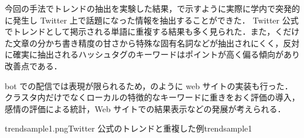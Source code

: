 
今回の手法でトレンドの抽出を実験した結果，で示すように実際に学内で突発的に発生し Twitter 上で話題になった情報を抽出することができた．
Twitter 公式でトレンドとして掲示される単語に重複する結果も多く見られた．また，くだけた文章の分かち書き精度の甘さから特殊な固有名詞などが抽出されにくく，反対に確実に抽出されるハッシュタグのキーワードはポイントが高く偏る傾向があり改善点である．

bot での配信では表現が限られるため，のように web サイトの実装も行った\cite{trend_elzup_com}．
クラスタ内だけでなくローカルの特徴的なキーワードに重きをおく評価の導入，感情の評価による統計，Web サイトでの結果表示などの発展が考えられる．


{trendsample1.png}{Twitter 公式のトレンドと重複した例}{trendsample1}


\newpage
